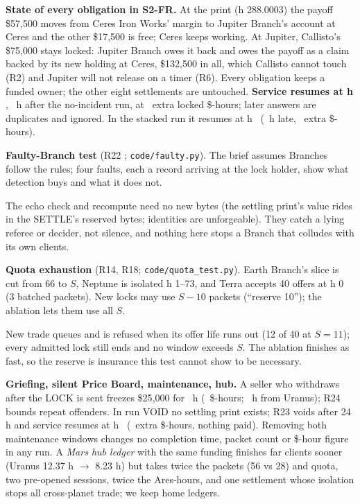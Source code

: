 \textbf{State of every obligation in S2-FR.} At the print (h 288.0003) the payoff \$57{,}500 moves from Ceres Iron Works' margin to Jupiter Branch's account at Ceres and the other
\$17{,}500 is free; Ceres keeps working. At Jupiter, Callisto's \$75{,}000 stays locked: Jupiter Branch owes it back and owes the payoff as a claim backed by its new holding at Ceres,
\$132{,}500 in all, which Callisto cannot touch (R2) and Jupiter will not release on a timer (R6). Every obligation keeps a funded owner; the other eight settlements are untouched.
\textbf{Service resumes at h \SimSTwoFRSpendable}, \SimSTwoFRLost\ h after the no-incident run, at \SimSTwoFRExtraDollarHours\ extra locked \$-hours; later answers are duplicates and
ignored. In the stacked run it resumes at h \SimStackSpendable\ (\SimStackLost\ h late, \SimStackExtraDollarHours\ extra \$-hours).

\textbf{Faulty-Branch test} (R22 \extension; \texttt{code/faulty.py}). The brief assumes Branches follow the rules; four faults, each a record arriving at the lock holder, show what
detection buys and what it does not.
\begin{center}\end{center}
The echo check and recompute need no new bytes (the settling print's value rides in the SETTLE's reserved bytes; identities are unforgeable). They catch a lying referee or decider, not
silence, and nothing here stops a Branch that colludes with its own clients.

\textbf{Quota exhaustion} (R14, R18; \texttt{code/quota\_test.py}). Earth Branch's slice is cut from 66 to $S$, Neptune is isolated h 1--73, and Terra accepts 40 offers at h 0 (3 batched
packets). New locks may use $S-10$ packets (``reserve 10''); the ablation lets them use all $S$.
\begin{center}\end{center}
New trade queues and is refused when its offer life runs out (12 of 40 at $S=11$); every admitted lock still ends and no window exceeds $S$. The ablation finishes as fast, so the reserve is
insurance this test cannot show to be necessary.

\textbf{Griefing, silent Price Board, maintenance, hub.} A seller who withdraws after the LOCK is sent freezes \$25{,}000 for \GriefVMHours\ h (\GriefVMDollarHours\ \$-hours; \GriefUranusHours\ h
from Uranus); R24 bounds repeat offenders. In run VOID no settling print exists; R23 voids after 24 h and service resumes at h \SimVoidSpendable\ (\SimVoidExtraDollarHours\ extra
\$-hours, nothing paid). Removing both maintenance windows changes no completion time, packet count or \$-hour figure in any run. A \emph{Mars hub ledger} with the same funding finishes far clients sooner (Uranus 12.37 h $\to$ 8.23 h) but takes twice the packets (56 vs 28) and
quota, two pre-opened sessions, twice the Ares-hours, and one settlement whose isolation stops all cross-planet trade; we keep home ledgers.
